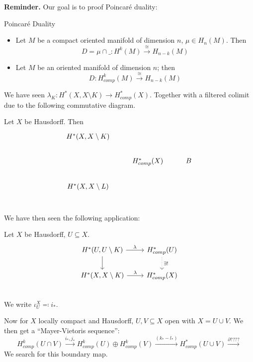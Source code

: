 \documentclass[language=english]{TemplateLecture}
\begin{document}

\textbf{Reminder.} Our goal is to proof Poincaré duality:

\begin{thm}{Poincaré Duality}{}
    \begin{itemize}
        \item Let \(M\) be a compact oriented manifold of dimension \(n\), \(\mu \in H_n(M)\). Then
        \[D = \mu \cap \_ \colon H^k(M) \xrightarrow{\cong} H_{n-k}(M)\]
        \item Let \(M\) be an oriented manifold of dimension \(n\); then
        \[D \colon H_{comp}^k(M) \xrightarrow{\cong} H_{n-k}(M)\]
    \end{itemize}
\end{thm}

We have seen \(\lambda_K \colon H^*(X, X\setminus K) \to H_{comp}^*(X)\). Together with a filtered colimit due to the following commutative diagram.
\begin{Proposition}
    Let \(X\) be Hausdorff. Then
    \[\begin{tikzcd}
        H^*(X,X\setminus K) & & \\
        & H^*_{comp}(X) & B \\
        H^*(X,X \setminus L) \\
    \end{tikzcd}\]%
\end{Proposition}
We have then seen the following application:
\begin{Proposition}
    Let \(X\) be Hausdorff, \(U \subseteq X\).
    \[\begin{tikzcd}
        H^*(U, U\setminus K) \ar[r, "\lambda"] \ar[d] & H_{comp}^*(U) \ar[d, dotted, "\exists !"] \\
        H^*(X, X\setminus K) \ar[r, "\lambda"] & H^*_{comp}(X) \\
    \end{tikzcd}\]
    We write \(\iota_U^X \eqcolon i_*\).
\end{Proposition}

Now for \(X\) locally compact and Hausdorff, \(U,V \subseteq X\) open with \(X = U \cup V\). We then get a \enquote{Mayer-Vietoris sequence}:
\[H_{comp}^k(U \cap V) \xrightarrow{i_*, j_*} H_{comp}^k(U) \oplus H_{comp}^k(V) \xrightarrow{(k_* - l_*)} H_{comp}^*(U \cup V) \xrightarrow{\partial ????}\]
We search for this boundary map.
\end{document}
